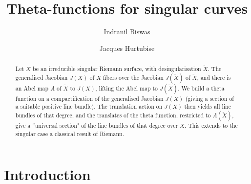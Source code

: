 \documentclass[12pt,reqno]{amsart}
\numberwithin{equation}{section}
\theoremstyle{definition}
\theoremstyle{remark}
\begin{document}
\title[Theta-functions for singular curves]{Theta-functions for singular curves}

\author[I. Biswas]{Indranil Biswas}

\address{Department of Mathematics, Shiv Nadar University, NH91, Tehsil
Dadri, Greater Noida, Uttar Pradesh 201314, India}


\author[J. Hurtubise]{Jacques Hurtubise}

\address{Department of Mathematics, McGill University, Burnside
Hall, 805 Sherbrooke St. W., Montreal, Que. H3A 2K6, Canada}




\date{}

\begin{abstract}
Let $X$ be an irreducible singular Riemann surface, with desingularisation $\widetilde X$. The generalised Jacobian
$J(X)$ of $X$ fibers over the Jacobian $J(\widetilde{X})$ of $\widetilde X$, and there is an Abel map
$A$ of $\widetilde X$ to $J(X)$, lifting the Abel map to $J(\widetilde X)$. We build a theta function on
a compactification of the generalised Jacobian $J(X)$ (giving a section of a suitable positive line
bundle). The translation action on $J(X)$ then yields all line bundles of that degree, and the translates
of the theta function, restricted to $A(\widetilde X)$, give a ``universal section" of the line bundles
of that degree over $X$. This extends to the singular case a classical result of Riemann.
\end{abstract}

\maketitle

\section{Introduction}\label{sec0}
\end{document}
